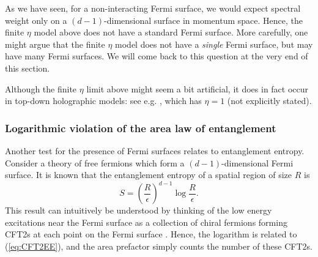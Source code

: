 \documentclass[10pt, oneside]{book}
\begin{document}
\begin{doublespace}
As we have seen, for a non-interacting Fermi surface, we would expect spectral weight only on a $(d-1)$-dimensional surface in momentum space.  Hence, the finite $\eta$ model above does not have a standard Fermi surface.    More carefully, one might argue that the finite $\eta$ model does not have a \emph{single} Fermi surface,  but may have many Fermi surfaces.   We will come back to this question at the very end of this section.

Although the finite $\eta$ limit above might seem a bit artificial, it does in fact occur in top-down holographic models:  see e.g. \cite{Gubser:2009qt}, which has $\eta=1$ (not explicitly stated).


\subsubsection{Logarithmic violation of the area law of entanglement}
Another test for the presence of Fermi surfaces relates to entanglement entropy.   Consider a theory of free fermions which form a $(d-1)$-dimensional Fermi surface.   It is known that the entanglement entropy of a spatial region of size $R$ is \cite{Wolf:2006zzb, klich2006} \begin{equation}
S = \left(\frac{R}{\epsilon}\right)^{d-1} \log \frac{R}{\epsilon}.
\end{equation}
This result can intuitively be understood by thinking of the low energy excitations near the Fermi surface as a collection of chiral fermions forming CFT2s at each point on the Fermi surface \cite{Swingle:2009bf}.  Hence,  the logarithm is related to (\ref{eq:CFT2EE}), and the area prefactor simply counts the number of these CFT2s.


\end{doublespace}
\end{document}

